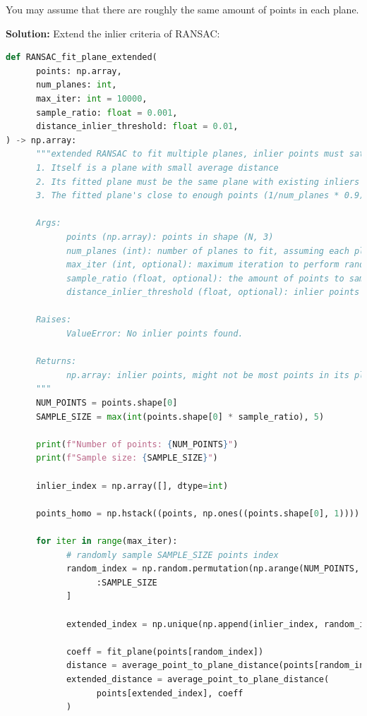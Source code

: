 \documentclass[conference,onecolumn]{IEEEtran}
\begin{document}
\begin{enumerate}[label=\arabic{enumi}.]
\begin{enumerate}
                        You may assume that there are roughly the same amount of points in each plane.

                        \textbf{Solution:}
                        Extend the inlier criteria of RANSAC:
                        \begin{lstlisting}[language=Python]
def RANSAC_fit_plane_extended(
      points: np.array,
      num_planes: int,
      max_iter: int = 10000,
      sample_ratio: float = 0.001,
      distance_inlier_threshold: float = 0.01,
) -> np.array:
      """extended RANSAC to fit multiple planes, inlier points must satisfy:
      1. Itself is a plane with small average distance
      2. Its fitted plane must be the same plane with existing inliers
      3. The fitted plane's close to enough points (1/num_planes * 0.9)

      Args:
            points (np.array): points in shape (N, 3)
            num_planes (int): number of planes to fit, assuming each plane has roughly the same number of inliers
            max_iter (int, optional): maximum iteration to perform random sampling. Defaults to 10000.
            sample_ratio (float, optional): the amount of points to sample, sample_ratio * N. Defaults to 0.0001. Will not be less than 5.
            distance_inlier_threshold (float, optional): inlier points maximum average distance to their fitted plane. Defaults to 0.01.

      Raises:
            ValueError: No inlier points found.

      Returns:
            np.array: inlier points, might not be most points in its plane
      """
      NUM_POINTS = points.shape[0]
      SAMPLE_SIZE = max(int(points.shape[0] * sample_ratio), 5)

      print(f"Number of points: {NUM_POINTS}")
      print(f"Sample size: {SAMPLE_SIZE}")

      inlier_index = np.array([], dtype=int)

      points_homo = np.hstack((points, np.ones((points.shape[0], 1))))

      for iter in range(max_iter):
            # randomly sample SAMPLE_SIZE points index
            random_index = np.random.permutation(np.arange(NUM_POINTS, dtype=int))[
                  :SAMPLE_SIZE
            ]

            extended_index = np.unique(np.append(inlier_index, random_index))

            coeff = fit_plane(points[random_index])
            distance = average_point_to_plane_distance(points[random_index], coeff)
            extended_distance = average_point_to_plane_distance(
                  points[extended_index], coeff
            )


\end{lstlisting}
\end{enumerate}
\end{enumerate}
\end{document}
